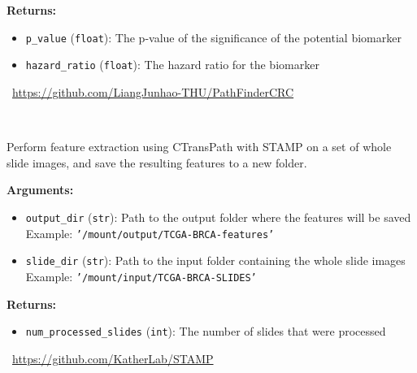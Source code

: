 \begin{tcolorbox}[title={\texttt{pathfinder\_verify\_biomarker}}]
\vspace{.5em}
\textbf{Returns:} \begin{itemize}[topsep=0pt,parsep=-1pt,partopsep=0pt]
\item \texttt{p\_value} (\texttt{float}): The p-value of the significance of the potential biomarker
\item \texttt{hazard\_ratio} (\texttt{float}): The hazard ratio for the biomarker
\end{itemize}
\tcblower
\setlength{\hangindent}{\widthof{\faGithub~}}
\faGithub~\url{https://github.com/LiangJunhao-THU/PathFinderCRC}

\vspace{.5em}\setlength{\hangindent}{\widthof{\faFile*[regular]~}}\faFile*[regular]~


\end{tcolorbox}

\begin{tcolorbox}[title={\texttt{stamp\_extract\_features}}]
Perform feature extraction using CTransPath with STAMP on a set of whole slide images, and save the resulting features to a new folder.

\vspace{.5em}
\textbf{Arguments:}
\begin{itemize}[topsep=0pt,parsep=-1pt,partopsep=0pt]
\item \texttt{output\_dir} (\texttt{str}): Path to the output folder where the features will be saved\\  Example: \texttt{'/mount/output/TCGA-BRCA-features'}
\item \texttt{slide\_dir} (\texttt{str}): Path to the input folder containing the whole slide images\\  Example: \texttt{'/mount/input/TCGA-BRCA-SLIDES'}
\end{itemize}

\vspace{.5em}
\textbf{Returns:} \begin{itemize}[topsep=0pt,parsep=-1pt,partopsep=0pt]
\item \texttt{num\_processed\_slides} (\texttt{int}): The number of slides that were processed
\end{itemize}
\tcblower
\setlength{\hangindent}{\widthof{\faGithub~}}
\faGithub~\url{https://github.com/KatherLab/STAMP}

\vspace{.5em}\setlength{\hangindent}{\widthof{\faFile*[regular]~}}\faFile*[regular]~


\end{tcolorbox}


